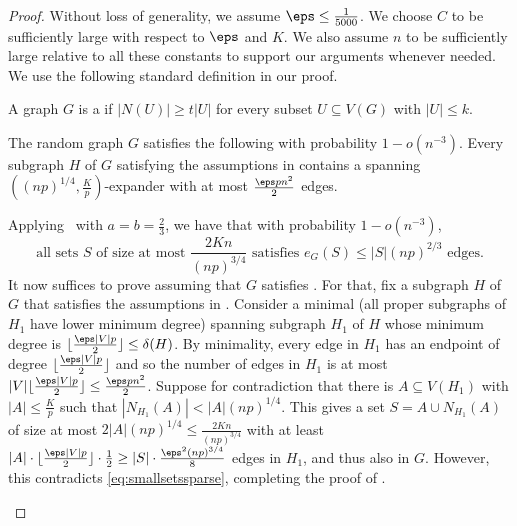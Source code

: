 \documentclass[10pt,a4paper,reqno]{amsart}
\begin{document}
\begin{proof}
Without loss of generality, we assume $\eps\le \frac{1}{5000}$. We choose $C$ to be sufficiently large with respect to $\eps$ and $K$. We also assume $n$ to be sufficiently large relative to all these constants to support our arguments whenever needed. We use the following standard definition in our proof.
\begin{definition}
A graph $G$ is a  if $|N(U)|\ge t|U|$ for every subset $U\subseteq V(G)$ with $|U|\le k$.
\end{definition}
\addtocounter{theorem}{-1}
\begin{claim}\label{clm:tk-expander}
The random graph $G$ satisfies the following with probability $1-o(n^{-3})$. Every subgraph $H$ of $G$ satisfying the assumptions in  contains a spanning $\left((np)^{1/4}, \frac{K}{p}\right)$-expander with at most $\frac{\eps p n^2}{2}$ edges. 
\end{claim}
\addtocounter{theorem}{1}
\begin{claimproof}
Applying~ with $a = b = \frac{2}{3}$, we have that with probability $1-o(n^{-3})$,
\begin{equation}\label{eq:smallsetssparse}
\text{all sets $S$ of size at most $\frac{2Kn}{(np)^{3/4}}$ satisfies $e_G(S)\le |S|(np)^{2/3}$ edges.}
\end{equation}
It now suffices to prove  assuming that $G$ satisfies . For that, fix a subgraph $H$ of $G$ that satisfies the assumptions in . Consider a minimal (all proper subgraphs of $H_1$ have lower minimum degree) spanning subgraph $H_1$ of $H$ whose minimum degree is $\lfloor\frac{\eps |V|p}{2}\rfloor \le \delta(H)$. By minimality, every edge in $H_1$ has an endpoint of degree $\lfloor\frac{\eps |V|p}{2}\rfloor$ and so the number of edges in $H_1$ is at most $|V|\lfloor\frac{\eps |V|p}{2}\rfloor \le \frac{\eps p n^2}{2}$. Suppose for contradiction that there is $A\subseteq V(H_1)$ with $|A|\le \frac{K}{p}$ such that $|N_{H_1}(A)|< |A|(np)^{1/4}$. This gives a set $S = A\cup N_{H_1}(A)$ of size at most $2|A|(np)^{1/4} \le \frac{2Kn}{(np)^{3/4}}$ with at least $|A|\cdot \lfloor\frac{\eps |V|p}{2}\rfloor\cdot \frac{1}{2} \ge |S| \cdot \frac{\eps^2 (np)^{3/4}}{8}$ edges in $H_1$, and thus also in $G$. However, this contradicts \eqref{eq:smallsetssparse}, completing the proof of .
\end{claimproof}


\end{proof}
\end{document}

